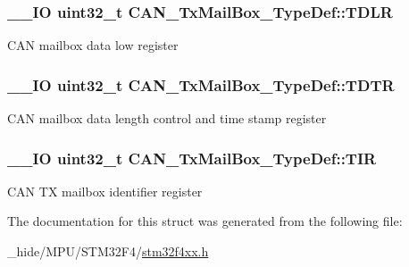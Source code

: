 \subsubsection[{T\+D\+L\+R}]{\setlength{\rightskip}{0pt plus 5cm}\+\_\+\+\_\+\+I\+O uint32\+\_\+t C\+A\+N\+\_\+\+Tx\+Mail\+Box\+\_\+\+Type\+Def\+::\+T\+D\+L\+R}\label{struct_c_a_n___tx_mail_box___type_def_a408c96501b1cc8bd527432736d132a39}
C\+A\+N mailbox data low register \hypertarget{struct_c_a_n___tx_mail_box___type_def_a2351cb865d064cf75f61642aaa887f76}{}
\subsubsection[{T\+D\+T\+R}]{\setlength{\rightskip}{0pt plus 5cm}\+\_\+\+\_\+\+I\+O uint32\+\_\+t C\+A\+N\+\_\+\+Tx\+Mail\+Box\+\_\+\+Type\+Def\+::\+T\+D\+T\+R}\label{struct_c_a_n___tx_mail_box___type_def_a2351cb865d064cf75f61642aaa887f76}
C\+A\+N mailbox data length control and time stamp register \hypertarget{struct_c_a_n___tx_mail_box___type_def_a22f525c909de2dcec1d4093fe1d562b8}{}
\subsubsection[{T\+I\+R}]{\setlength{\rightskip}{0pt plus 5cm}\+\_\+\+\_\+\+I\+O uint32\+\_\+t C\+A\+N\+\_\+\+Tx\+Mail\+Box\+\_\+\+Type\+Def\+::\+T\+I\+R}\label{struct_c_a_n___tx_mail_box___type_def_a22f525c909de2dcec1d4093fe1d562b8}
C\+A\+N T\+X mailbox identifier register 

The documentation for this struct was generated from the following file\+:\begin{DoxyCompactItemize}
\item 
\+\_\+hide/\+M\+P\+U/\+S\+T\+M32\+F4/\hyperlink{stm32f4xx_8h}{stm32f4xx.\+h}\end{DoxyCompactItemize}
